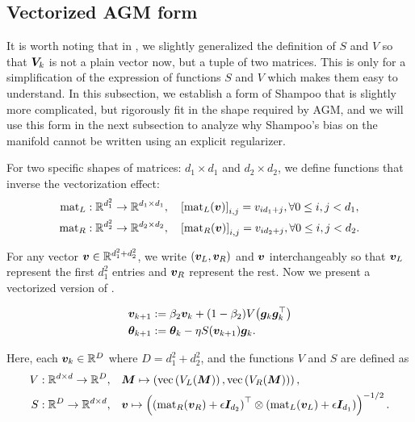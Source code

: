 \subsection{Vectorized AGM form}
It is worth noting that in , we slightly generalized the definition of $S$ and $V$ so that ${\bm{V}}_k$ is not a plain vector now, but a tuple of two matrices. This is only for a simplification of the expression of functions $S$ and $V$ which makes them easy to understand. In this subsection, we establish a form of Shampoo that is slightly more complicated, but rigorously fit in the shape required by AGM, and we will use this form in the next subsection to analyze why Shampoo's bias on the manifold cannot be written using an explicit regularizer.


For two specific shapes of matrices: $d_1 \times d_1$ and $d_2 \times d_2$, we define functions that inverse the vectorization effect:
\begin{align*}
    \mathrm{mat}_L: \mathbb{R}^{d_1^2} \rightarrow \mathbb{R}^{d_1 \times d_1}, &\quad  \left[\mathrm{mat}_L({\bm{v}})\right]_{i,j} = v_{id_1 + j}, \forall 0 \leq i, j < d_1, \\
    \mathrm{mat}_R: \mathbb{R}^{d_2^2} \rightarrow \mathbb{R}^{d_2 \times d_2}, &\quad \left[\mathrm{mat}_R({\bm{v}})\right]_{i,j} = v_{id_2 + j}, \forall 0 \leq i, j < d_2. 
\end{align*}

For any vector ${\bm{v}} \in \mathbb{R}^{d_1^2 + d_2^2}$, we write $({\bm{v}}_L, {\bm{v}}_R)$ and ${\bm{v}}$ interchangeably so that ${\bm{v}}_L$ represent the first $d_1^2$ entries and ${\bm{v}}_R$ represent the rest. Now we present a vectorized version of .

\begin{definition}\label{def:shampoo-vectorized-agm}
    \begin{align*}
        {\bm{v}}_{k+1} &:= \beta_2 {\bm{v}}_{k} + (1-\beta_2) V\!\left({\bm{g}}_{k}{\bm{g}}_{k}^\top\right) \\
    {\bm{\theta}}_{k+1} &:= {\bm{\theta}}_{k} - \eta S({\bm{v}}_{k+1}) {\bm{g}}_{k}. 
\end{align*}
\end{definition}
Here, each ${\bm{v}}_k \in \mathbb{R}^{D}$ where $D = d_1^2 + d_2^2$, and the functions $V$ and $S$ are defined as \begin{align*}
    V: \mathbb{R}^{d \times d} \rightarrow \mathbb{R}^{D}, & \quad {\bm{M}} \mapsto \left(\mathrm{vec}\left(V_L({\bm{M}})\right), \mathrm{vec}\left(V_R({\bm{M}})\right)\right), \\
    S: \mathbb{R}^{D} \rightarrow \mathbb{R}^{d \times d}, & \quad {\bm{v}} \mapsto \left(\left(\mathrm{mat}_R({\bm{v}}_R)+\epsilon {\bm{I}}_{d_2}\right)^\top \otimes \left(\mathrm{mat}_L({\bm{v}}_L)+\epsilon {\bm{I}}_{d_1}\right)\right)^{-1/2}.
\end{align*}


